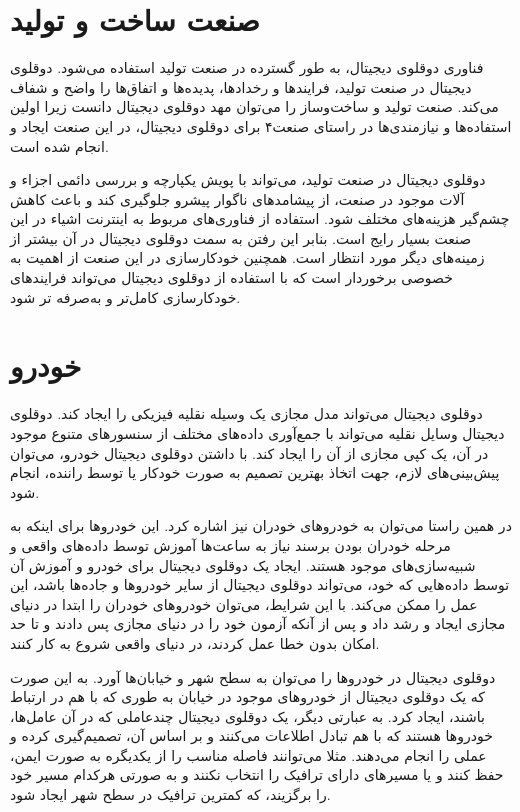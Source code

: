 \section{صنعت ساخت و تولید}
فناوری دوقلوی دیجیتال، به طور گسترده در صنعت تولید استفاده می‌شود. دوقلو‌ی دیجیتال در صنعت تولید، فرایند‌ها و رخداد‌ها، پدیده‌ها و اتفاق‌ها را واضح و شفاف می‌کند. صنعت تولید و ساخت‌وساز را می‌توان مهد دوقلوی دیجیتال دانست زیرا اولین استفاده‌ها و نیازمندی‌ها در راستای صنعت۴ برای دوقلوی دیجیتال، در این صنعت ایجاد و انجام شده‌ است.

دوقلوی دیجیتال در صنعت تولید، می‌تواند با پویش یکپارچه و بررسی دائمی اجزاء و آلات موجود در صنعت، از پیشامد‌های ناگوار پیشرو جلوگیری کند و باعث کاهش چشم‌گیر هزینه‌های مختلف شود. استفاده از فناوری‌های مربوط به اینترنت اشیاء در این صنعت بسیار رایج است. بنابر این رفتن به سمت دوقلوی دیجیتال در آن بیشتر از زمینه‌های دیگر مورد انتظار است. همچنین خودکار‌سازی در این صنعت از اهمیت به خصوصی برخوردار است که با استفاده از دوقلوی دیجیتال می‌تواند فرایند‌های خودکار‌سازی کامل‌تر و به‌صرفه تر شود.


\section{خودرو}
دوقلوی دیجیتال می‌تواند مدل مجازی یک وسیله نقلیه فیزیکی را ایجاد کند. دوقلوی دیجیتال وسایل نقلیه می‌تواند با جمع‌آوری داده‌های مختلف از سنسور‌های متنوع موجود در آن، یک کپی مجازی از آن را ایجاد کند. با داشتن دوقلوی دیجیتال خودرو، می‌توان پیش‌بینی‌های لازم، جهت اتخاذ بهترین تصمیم به صورت خودکار یا توسط راننده، انجام شود. 

در همین راستا می‌توان به خودرو‌های خودران نیز اشاره کرد. این خودرو‌ها برای اینکه به مرحله خودران بودن برسند نیاز به ساعت‌ها آموزش توسط داده‌های واقعی و شبیه‌سازی‌های موجود هستند. ایجاد یک دوقلوی دیجیتال برای خودرو و آموزش آن توسط داده‌هایی که خود، می‌تواند دوقلوی دیجیتال از سایر خودرو‌ها و جاده‌ها باشد، این عمل را ممکن می‌کند. با این شرایط، می‌توان خودرو‌های خودران را ابتدا در دنیای مجازی ایجاد و رشد داد و پس از آنکه آزمون خود را در دنیای مجازی پس دادند و تا حد امکان بدون خطا عمل کردند، در دنیای واقعی شروع به کار کنند.

دوقلوی دیجیتال در خودرو‌ها را می‌توان به سطح شهر و خیابان‌ها آورد. به این صورت که یک دوقلوی دیجیتال از خودرو‌های موجود در خیابان به طوری که با هم در ارتباط باشند، ایجاد کرد. به عبارتی دیگر، یک دوقلوی دیجیتال چندعاملی که در آن عامل‌ها، خودرو‌ها هستند که با هم تبادل اطلاعات می‌کنند و بر اساس آن،‌ تصمیم‌گیری کرده و عملی را انجام می‌دهند. مثلا می‌توانند فاصله مناسب را از یکدیگره به صورت ایمن، حفظ کنند و یا مسیر‌های دارای ترافیک را انتخاب نکنند و به صورتی هرکدام مسیر خود را برگزیند، که کمترین ترافیک در سطح شهر ایجاد شود.

